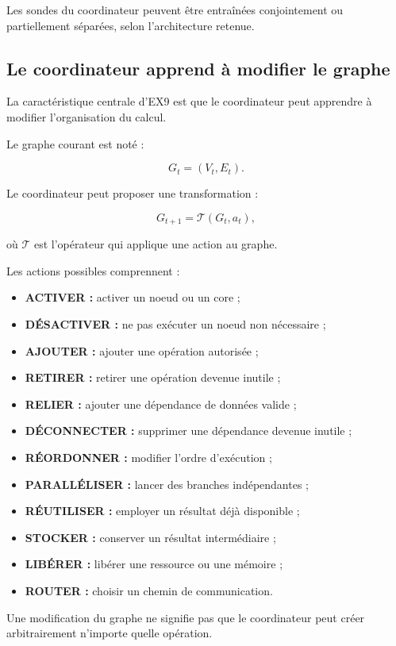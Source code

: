 \documentclass[11pt,a4paper]{article}
\begin{document}
Les sondes du coordinateur peuvent être entraînées conjointement
ou partiellement séparées, selon l'architecture retenue.

\subsection{Le coordinateur apprend à modifier le graphe}

La caractéristique centrale d'EX9 est que le coordinateur peut
apprendre à modifier l'organisation du calcul.

Le graphe courant est noté :

\[
G_t=(V_t,E_t).
\]

Le coordinateur peut proposer une transformation :

\[
G_{t+1}
=
\mathcal{T}(G_t,a_t),
\]

où $\mathcal{T}$ est l'opérateur qui applique une action au graphe.

Les actions possibles comprennent :

\begin{itemize}
  \item \textbf{ACTIVER :} activer un noeud ou un core ;
  \item \textbf{DÉSACTIVER :} ne pas exécuter un noeud non nécessaire ;
  \item \textbf{AJOUTER :} ajouter une opération autorisée ;
  \item \textbf{RETIRER :} retirer une opération devenue inutile ;
  \item \textbf{RELIER :} ajouter une dépendance de données valide ;
  \item \textbf{DÉCONNECTER :} supprimer une dépendance devenue inutile ;
  \item \textbf{RÉORDONNER :} modifier l'ordre d'exécution ;
  \item \textbf{PARALLÉLISER :} lancer des branches indépendantes ;
  \item \textbf{RÉUTILISER :} employer un résultat déjà disponible ;
  \item \textbf{STOCKER :} conserver un résultat intermédiaire ;
  \item \textbf{LIBÉRER :} libérer une ressource ou une mémoire ;
  \item \textbf{ROUTER :} choisir un chemin de communication.
\end{itemize}

Une modification du graphe ne signifie pas que le coordinateur
peut créer arbitrairement n'importe quelle opération.
\end{document}
